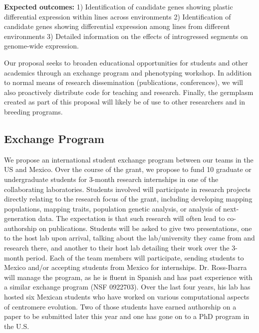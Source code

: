 {\bf Expected outcomes:} 1) Identification of candidate genes showing plastic differential expression within lines across environments 2) Identification of candidate genes showing differential expression among lines from different environments 3) Detailed information on the effects of introgressed segments on genome-wide expression. 


Our proposal seeks to broaden educational opportunities for students and other academics through an exchange program and phenotyping workshop.  In addition to normal means of research dissemination (publications, conferences), we will also proactively distribute code for teaching and research.  Finally, the germplasm created as part of this proposal will likely be of use to other researchers and in breeding programs.

\subsection*{Exchange Program} 

We propose an international student exchange program between our teams in the US and Mexico. Over the course of the grant, we propose to fund 10 graduate or undergraduate students for 3-month research internships in one of the collaborating laboratories. Students involved will participate in research projects directly relating to the research focus of the grant, including developing mapping populations, mapping traits, population genetic analysis, or analysis of next-generation data. The expectation is that such research will often lead to co-authorship on publications. Students will be asked to give two presentations, one to the host lab upon arrival, talking about the lab/university they came from and research there, and another to their host lab detailing their work over the 3-month period.  Each of the team members will participate, sending students to Mexico and/or accepting students from Mexico for internships. Dr. Ross-Ibarra will manage the program, as he is fluent in Spanish and has past experience with a similar exchange program (NSF 0922703). Over the last four years, his lab has hosted six Mexican students who have worked on various computational aspects of centromere evolution. Two of those students have earned authorship on a paper to be submitted later this year and one has gone on to a PhD program in the U.S.

